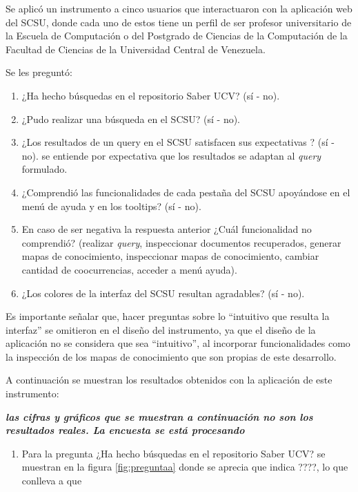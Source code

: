 \documentclass[
  12pt,
  openany]{book}
\providecommand{\tightlist}{%
  \setlength{\itemsep}{0pt}\setlength{\parskip}{0pt}}
\begin{document}
Se aplicó un instrumento a cinco usuarios que interactuaron con la aplicación web del SCSU, donde cada uno de estos tiene un perfil de ser profesor universitario de la Escuela de Computación o del Postgrado de Ciencias de la Computación de la Facultad de Ciencias de la Universidad Central de Venezuela.

Se les preguntó:

\begin{enumerate}
\def\labelenumi{\arabic{enumi}.}
\item
  ¿Ha hecho búsquedas en el repositorio Saber UCV? (sí - no).
\item
  ¿Pudo realizar una búsqueda en el SCSU? (sí - no).
\item
  ¿Los resultados de un query en el SCSU satisfacen sus expectativas ? (sí - no). se entiende por expectativa que los resultados se adaptan al \emph{query} formulado.
\item
  ¿Comprendió las funcionalidades de cada pestaña del SCSU apoyándose en el menú de ayuda y en los tooltips? (sí - no).
\item
  En caso de ser negativa la respuesta anterior ¿Cuál funcionalidad no comprendió? (realizar \emph{query}, inspeccionar documentos recuperados, generar mapas de conocimiento, inspeccionar mapas de conocimiento, cambiar cantidad de coocurrencias, acceder a menú ayuda).
\item
  ¿Los colores de la interfaz del SCSU resultan agradables? (sí - no).
\end{enumerate}

Es importante señalar que, hacer preguntas sobre lo ``intuitivo que resulta la interfaz'' se omitieron en el diseño del instrumento, ya que el diseño de la aplicación no se considera que sea ``intuitivo'', al incorporar funcionalidades como la inspección de los mapas de conocimiento que son propias de este desarrollo.

A continuación se muestran los resultados obtenidos con la aplicación de este instrumento:

\textbf{\emph{las cifras y gráficos que se muestran a continuación no son los resultados reales. La encuesta se está procesando}}

\begin{enumerate}
\def\labelenumi{\arabic{enumi}.}
\tightlist
\item
  Para la pregunta ¿Ha hecho búsquedas en el repositorio Saber UCV? se muestran en la figura \ref{fig:preguntaa} donde se aprecia que indica ????, lo que conlleva a que
\end{enumerate}
\end{document}
